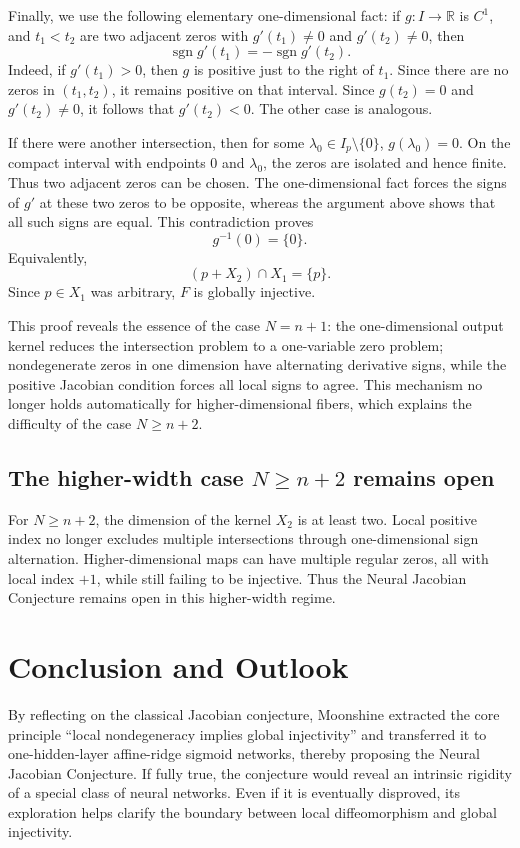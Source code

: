 \documentclass[a4paper,11pt]{article}
\theoremstyle{plain}
\theoremstyle{definition}
\theoremstyle{remark}
\DeclareMathOperator{\sgn}{sgn}
\begin{document}
Finally, we use the following elementary one-dimensional fact: if \(g:I\to\mathbb R\) is \(C^1\), and \(t_1<t_2\) are two adjacent zeros with \(g'(t_1)\ne0\) and \(g'(t_2)\ne0\), then
\[
\sgn g'(t_1)=-\sgn g'(t_2).
\]
Indeed, if \(g'(t_1)>0\), then \(g\) is positive just to the right of \(t_1\). Since there are no zeros in \((t_1,t_2)\), it remains positive on that interval. Since \(g(t_2)=0\) and \(g'(t_2)\ne0\), it follows that \(g'(t_2)<0\). The other case is analogous.

If there were another intersection, then for some \(\lambda_0\in I_p\setminus\{0\}\), \(g(\lambda_0)=0\). On the compact interval with endpoints \(0\) and \(\lambda_0\), the zeros are isolated and hence finite. Thus two adjacent zeros can be chosen. The one-dimensional fact forces the signs of \(g'\) at these two zeros to be opposite, whereas the argument above shows that all such signs are equal. This contradiction proves
\[
g^{-1}(0)=\{0\}.
\]
Equivalently,
\[
(p+X_2)\cap X_1=\{p\}.
\]
Since \(p\in X_1\) was arbitrary, \(F\) is globally injective.

This proof reveals the essence of the case \(N=n+1\): the one-dimensional output kernel reduces the intersection problem to a one-variable zero problem; nondegenerate zeros in one dimension have alternating derivative signs, while the positive Jacobian condition forces all local signs to agree. This mechanism no longer holds automatically for higher-dimensional fibers, which explains the difficulty of the case \(N\ge n+2\).

\subsection{The higher-width case \texorpdfstring{\(N\ge n+2\)}{N >= n+2} remains open}

For \(N\ge n+2\), the dimension of the kernel \(X_2\) is at least two. Local positive index no longer excludes multiple intersections through one-dimensional sign alternation. Higher-dimensional maps can have multiple regular zeros, all with local index \(+1\), while still failing to be injective. Thus the Neural Jacobian Conjecture remains open in this higher-width regime.

\section{Conclusion and Outlook}

By reflecting on the classical Jacobian conjecture, Moonshine extracted the core principle ``local nondegeneracy implies global injectivity'' and transferred it to one-hidden-layer affine-ridge sigmoid networks, thereby proposing the Neural Jacobian Conjecture. If fully true, the conjecture would reveal an intrinsic rigidity of a special class of neural networks. Even if it is eventually disproved, its exploration helps clarify the boundary between local diffeomorphism and global injectivity.
\end{document}
